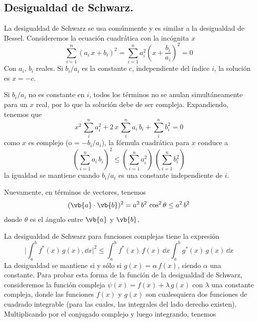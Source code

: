 \subsection{Desigualdad de Schwarz.}
 La desigualdad de Schwarz se usa comúnmente y es similar a la desigualdad de Bessel. Consideremos la ecuación cuadrática con la incógnita $x$
 \begin{equation}
\sum_{i=1}^{n} (a_{i} \, x + b_{i})^{2} = \sum_{i=1}^{n} a_{i}^{2} \left( x + \frac{b_{i}}{a_{i}} \right)^{2} = 0
\label{eq:ecuacion_10_74}
\end{equation}
Con $a_{i}$, $b_{i}$ reales. Si $b_{i}/a_{i}$ es la constante $c$, independiente del índice $i$, la solución es $x= - c$. 
\par
Si $b_{i}/a_{i}$ no es constante en $i$, todos los términos no se anulan simultáneamente para un $x$ real, por lo que la solución debe de ser compleja. Expandiendo, tenemos que
\begin{equation}
x^{2} \, \sum_{i}^{n} a_{i}^{2} + 2 \, x \, \sum_{i}^{n} a_{i} \, b_{i} + \sum_{i}^{n} b_{i}^{2} = 0
\label{eq:ecuacion_10_75}
\end{equation}
como $x$ es complejo (o = $-b_{i}/a_{i}$), la fórmula cuadrática para $x$ conduce a 
\begin{equation}
\left( \sum_{i=1}^{n} a_{i} \, b_{i} \right)^{2} \leq \left( \sum_{i=1}^{n} a_{i}^{2} \right) \, \left( \sum_{i=1}^{n} b_{i}^{2} \right)
\label{eq:ecuacion_10_76}
\end{equation}
la igualdad se mantiene cuando $b_{i}/a_{i}$ es una constante independiente de $i$.
\par
Nuevamente, en términos de vectores, tenemos
\begin{equation}
( \vb{a} \cdot \vb{b} )^{2} =  a^{2} \, b^{2} \, \cos^{2} \theta \leq a^{2} \, b^{2}
\label{eq:ecuacion_10_77}
\end{equation}
donde $\theta$ es el ángulo entre $\vb{a}$ y $\vb{b}$.
\par
La desigualdad de Schwarz para funciones complejas tiene la expresión
\begin{equation}
\boxed{
\Bigg\vert \int_{a}^{b} f^{*} (x) \, g(x) , \dd{x} \Bigg\vert^{2} \leq \int_{a}^{b} f^{*}(x) \, f(x) \, \dd{x} \int_{a}^{b} g^{*}(x) \, g(x) \, \dd{x}}
\label{eq:ecuacion_10_78}
\end{equation}
La desigualdad se mantiene si y sólo si $g(x) = \alpha \, f(x)$, siendo $\alpha$ una constante. Para probar esta forma de la función de la desigualdad de Schwarz, consideremos la función compleja $\psi(x) = f(x) + \lambda \, g(x)$ con $\lambda$ una constante compleja, donde las funciones $f(x)$ y $g(x)$ son cualesquiera dos funciones de cuadrado integrable (para las cuales, las integrales del lado derecho existen). Multiplicando por el conjugado complejo y luego integrando, tenemos
